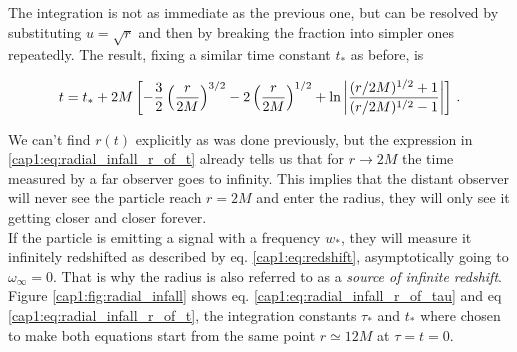 The integration is not as immediate as the previous one, but can be resolved
by substituting $u = \sqrt{r}$ and then by breaking the fraction into simpler
ones repeatedly.
The result, fixing a similar time constant $t_*$ as before, is

\begin{equation}
    t = t_* + 2M \left[ -\frac{3}{2} \left(\frac{r}{2M}\right)^{3/2}
    - 2 \left(\frac{r}{2M}\right)^{1/2}
    + \ln \abs{\frac{(r/2M)^{1/2} + 1}{(r/2M)^{1/2} - 1}} \right] \, .
    \label{cap1:eq:radial_infall_r_of_t}
\end{equation}

We can't find $r(t)$ explicitly as was done previously, but the expression in
\ref{cap1:eq:radial_infall_r_of_t} already tells us that for
$r \rightarrow 2M$ the time measured by a far observer goes to infinity.
This implies that the distant observer will never see the particle reach
$r = 2M$ and enter the \Sh radius, they will only see it getting closer and
closer forever. \\
If the particle is emitting a signal with a frequency $w_*$, they will measure
it infinitely redshifted as described by eq. \ref{cap1:eq:redshift},
asymptotically going to $\omega_\infty = 0$.
That is why the \Sh radius is also referred to as a
\textit{source of infinite redshift}. \\
Figure \ref{cap1:fig:radial_infall} shows eq.
\ref{cap1:eq:radial_infall_r_of_tau} and eq
\ref{cap1:eq:radial_infall_r_of_t}, the integration constants $\tau_*$ and
$t_*$ where chosen to make both equations start from the same point
$r \simeq 12M$ at $\tau = t =  0$.

